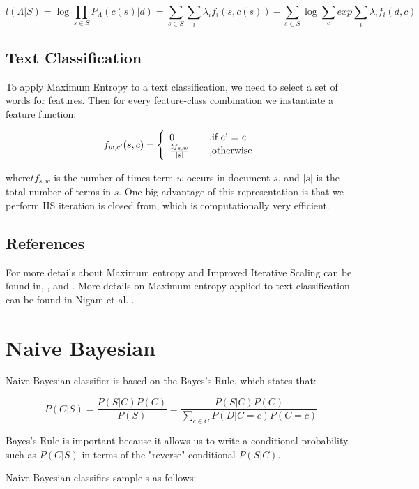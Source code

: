 \documentclass{report}
\begin{document}
\[
l(\Lambda|S) = \log \prod_{s \in S} P_{\Lambda}(c(s)|d) = \sum_{s \in S} \sum_{i} \lambda_i f_i(s, c(s)) - \sum_{s \in S} \log \sum_{c} exp \sum_{i} \lambda_i f_i(d,c)
\]

\subsection{Text Classification}

To apply Maximum Entropy to a text classification, we need to select a set of words for features. Then for every feature-class combination we instantiate a feature function:

\[
f_{w,c'}(s,c) =  \left\{ 
  \begin{array}{l l}
    0 & \quad \text{,if c' = c}\\
    \frac{tf_{s,w}}{|s|} & \quad \text{,otherwise}\\
  \end{array} \right.
\]

where$ tf_{s,w}$ is the number of times term $w$ occurs in document $s$, and $|s|$ is the total number of terms in $s$.
One big advantage of this representation is that we perform IIS iteration is closed from, which is computationally very efficient.

\subsection{References}

For more details about Maximum entropy and Improved Iterative Scaling can be found in\cite{berger_a1-etal:1996a}, \cite{berger:gental}, \cite{manning99} and \cite{oai:CiteSeerPSU:93050}. More details on Maximum entropy applied to text classification can be found in Nigam et al. \cite{oai:CiteSeerPSU:93050}.

\section{Naive Bayesian}

Naive Bayesian classifier is based on the Bayes's Rule, which states that:

\[
P(C|S) = \frac{P (S|C) P (C)}{P(S)} = \frac{P (S|C) P (C)}{\sum_{c \in C} P(D|C=c)P(C=c)}
\]

Bayes's Rule is important because it allows us to write a conditional probability, such as $P(C|S)$ in terms of the "reverse" conditional 
$P(S|C)$.

Naive Bayesian classifies sample s as follows:
\end{document}
